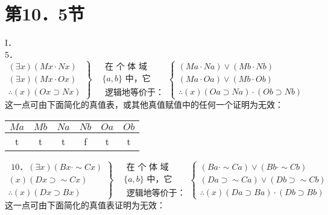 \section*{第10．5节}
I．\\
5． $\left.\begin{array}{rl}(\exists x)(M x \cdot N x) \\ (\exists x)(M x \cdot O x) \\ \therefore(x)(O x \supset N x)\end{array}\right\} \begin{aligned} & \text { 在 个 体 域 } \\ & \{a, b\} \text { 中，它 } \\ & \text { 逻辑地等价于：}\end{aligned}\left\{\begin{array}{l}(M a \cdot N a) \vee(M b \cdot N b) \\ (M a \cdot O a) \vee(M b \cdot O b) \\ \therefore(x)(O a \supset N a) \cdot(O b \supset N b)\end{array}\right.$\\
这一点可由下面简化的真值表，或其他真值赋值中的任何一个证明为无效：

\begin{center}
\begin{tabular}{cccccc}
$M a$ & $M b$ & $N a$ & $N b$ & $O a$ & $O b$ \\
\hline
t & t & t & f & t & t \\
\hline
\end{tabular}
\end{center}

$\left.\begin{array}{c}\text { 10．}(\exists x)(B x \cdot \sim C x) \\ (x)(D x \supset \sim C x) \\ \therefore(x)(D x \supset B x)\end{array}\right\} \begin{aligned} & \text { 在 个 体 域 } \\ & \{a, b\} \text { 中，它 } \\ & \text { 逻辑地等价于：}\end{aligned}\left\{\begin{array}{l}(B a \cdot \sim C a) \vee(B b \cdot \sim C b) \\ (D a \supset \sim C a) \vee(D b \supset \sim C b) \\ \therefore(x)(D a \supset B a) \cdot(D b \supset B b)\end{array}\right.$\\
这一点可由下面简化的真值表证明为无效：


